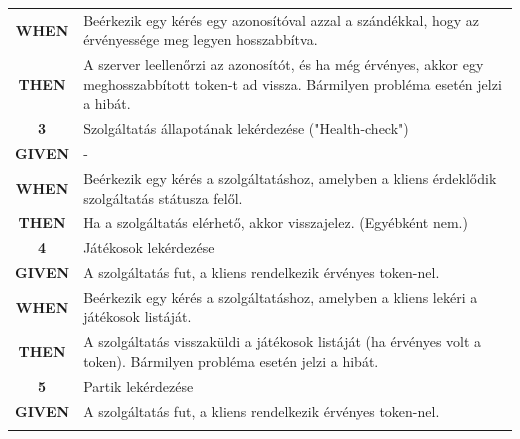 \documentclass[twoside, a4paper, 12pt]{article}
\begin{document}
\begin{longtable}[c]{|c|p{14cm}|}
	\textbf{WHEN} &
	Beérkezik egy kérés egy azonosítóval azzal a szándékkal, hogy az érvényessége meg legyen hosszabbítva.
	\\
	\nobreakhline
	
	\textbf{THEN} &
	A szerver leellenőrzi az azonosítót, és ha még érvényes, akkor egy meghosszabbított token-t ad vissza.
	Bármilyen probléma esetén jelzi a hibát.
	\\
	\hline
	
	
	\rowcolor[HTML]{CBCEFB} 
	\textbf{3}
	&	Szolgáltatás állapotának lekérdezése ("Health-check")
	\\ \nobreakhline
	
	\textbf{GIVEN} &
	-
	\\ \nobreakhline
	
	\textbf{WHEN} &
	Beérkezik egy kérés a szolgáltatáshoz, amelyben a kliens érdeklődik szolgáltatás státusza felől.
	\\
	\nobreakhline
	
	\textbf{THEN} &
	Ha a szolgáltatás elérhető, akkor visszajelez. (Egyébként nem.)
	\\
	\hline
	
	
	\rowcolor[HTML]{CBCEFB} 
	\textbf{4}
	&	Játékosok lekérdezése
	\\ \nobreakhline
	
	\textbf{GIVEN} &
	A szolgáltatás fut, a kliens rendelkezik érvényes token-nel.
	\\ \nobreakhline
	
	\textbf{WHEN} &
	Beérkezik egy kérés a szolgáltatáshoz, amelyben a kliens lekéri a játékosok listáját.
	\\
	\nobreakhline
	
	\textbf{THEN} &
	A szolgáltatás visszaküldi a játékosok listáját (ha érvényes volt a token).
	Bármilyen probléma esetén jelzi a hibát.
	\\
	\hline
	
	
	\rowcolor[HTML]{CBCEFB} 
	\textbf{5}
	&	Partik lekérdezése
	\\ \nobreakhline
	
	\textbf{GIVEN} &
	A szolgáltatás fut, a kliens rendelkezik érvényes token-nel.
	\\ \nobreakhline
	

\end{longtable}
\end{document}
